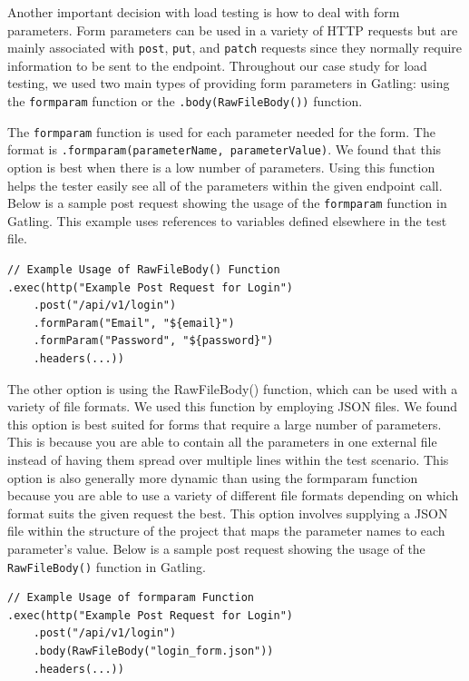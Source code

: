 Another important decision with load testing is how to deal with form parameters. Form parameters can be used in a variety of HTTP requests but are mainly associated with \texttt{post}, \texttt{put}, and \texttt{patch} requests since they normally require information to be sent to the endpoint. Throughout our case study for load testing, we used two main types of providing form parameters in Gatling: using the \texttt{formparam} function or the \texttt{.body(RawFileBody())} function. 

The \texttt{formparam} function is used for each parameter needed for the form. The format is \texttt{.formparam(parameterName, parameterValue)}. We found that this option is best when there is a low number of parameters. Using this function helps the tester easily see all of the parameters within the given endpoint call. Below is a sample post request showing the usage of the \texttt{formparam} function in Gatling. This example uses references to variables defined elsewhere in the test file.

\begin{lstlisting}
// Example Usage of RawFileBody() Function
.exec(http("Example Post Request for Login")
    .post("/api/v1/login")
    .formParam("Email", "${email}")
    .formParam("Password", "${password}")
    .headers(...))
\end{lstlisting}

The other option is using the RawFileBody() function, which can be used with a variety of file formats. We used this function by employing JSON files. We found this option is best suited for forms that require a large number of parameters. This is because you are able to contain all the parameters in one external file instead of having them spread over multiple lines within the test scenario. This option is also generally more dynamic than using the formparam function because you are able to use a variety of different file formats depending on which format suits the given request the best. This option involves supplying a JSON file within the structure of the project that maps the parameter names to each parameter's value. Below is a sample post request showing the usage of the \texttt{RawFileBody()} function in Gatling.

\begin{lstlisting}
// Example Usage of formparam Function
.exec(http("Example Post Request for Login")
    .post("/api/v1/login")
    .body(RawFileBody("login_form.json"))
    .headers(...))
\end{lstlisting}

